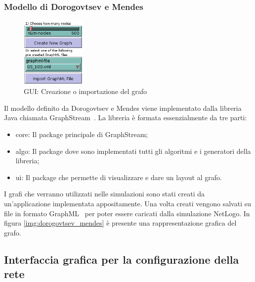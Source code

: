 \subsubsection{Modello di Dorogovtsev e Mendes}
\label{section:graph_topologies_dm}

\begin{figure}
  \vspace*{-25pt}
  \begin{center}
    \includegraphics[width=0.28\textwidth]{img/gui-graph.png}
  \end{center}
 \vspace*{-10pt}
 \caption{GUI: Creazione o importazione del grafo}
 \vspace*{-35pt}
 \label{img:gui_graph}
\end{figure}

Il modello definito da Dorogovtsev e Mendes viene implementato dalla libreria Java chiamata GraphStream~\cite{biblio:graphstream}.
La libreria è formata essenzialmente da tre parti: 
\begin{itemize}
 \item core: Il package principale di GraphStream;
 \item algo: Il package dove sono implementati tutti gli algoritmi e i generatori della libreria;
 \item ui: Il package che permette di visualizzare e dare un layout al grafo.
\end{itemize}
I grafi che verranno utilizzati nelle simulazioni sono stati creati da un'applicazione implementata appositamente.
Una volta creati vengono salvati su file in formato GraphML~\cite{biblio:graphml} per poter 
essere caricati dalla simulazione NetLogo. 
In figura \ref{img:dorogovtsev_mendes} è presente una rappresentazione grafica del grafo.



\subsection{Interfaccia grafica per la configurazione della rete}
\label{section:gui_setup_graph}

